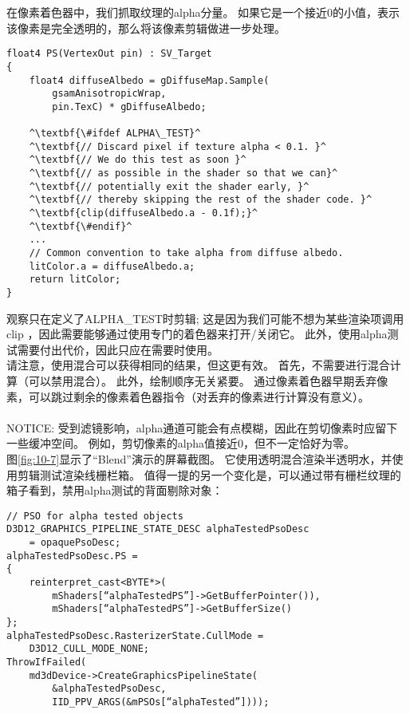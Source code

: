 \begin{flushleft}
在像素着色器中，我们抓取纹理的alpha分量。 如果它是一个接近0的小值，表示该像素是完全透明的，那么将该像素剪辑做进一步处理。
\end{flushleft}

\begin{lstlisting}[escapechar=^]
float4 PS(VertexOut pin) : SV_Target
{
    float4 diffuseAlbedo = gDiffuseMap.Sample(
        gsamAnisotropicWrap, 
        pin.TexC) * gDiffuseAlbedo;

    ^\textbf{\#ifdef ALPHA\_TEST}^
    ^\textbf{// Discard pixel if texture alpha < 0.1. }^
    ^\textbf{// We do this test as soon }^
    ^\textbf{// as possible in the shader so that we can}^
    ^\textbf{// potentially exit the shader early, }^
    ^\textbf{// thereby skipping the rest of the shader code. }^
    ^\textbf{clip(diffuseAlbedo.a - 0.1f);}^
    ^\textbf{\#endif}^
    ...
    // Common convention to take alpha from diffuse albedo.
    litColor.a = diffuseAlbedo.a;
    return litColor;
}
\end{lstlisting}

\begin{flushleft}
观察只在定义了ALPHA\_TEST时剪辑; 这是因为我们可能不想为某些渲染项调用 clip ，因此需要能够通过使用专门的着色器来打开/关闭它。 此外，使用alpha测试需要付出代价，因此只应在需要时使用。\\

请注意，使用混合可以获得相同的结果，但这更有效。 首先，不需要进行混合计算（可以禁用混合）。 此外，绘制顺序无关紧要。 通过像素着色器早期丢弃像素，可以跳过剩余的像素着色器指令（对丢弃的像素进行计算没有意义）。\\
~\\
NOTICE: 受到滤镜影响，alpha通道可能会有点模糊，因此在剪切像素时应留下一些缓冲空间。 例如，剪切像素的alpha值接近0，但不一定恰好为零。
~\\

图\ref{fig:10-7}显示了“Blend”演示的屏幕截图。 它使用透明混合渲染半透明水，并使用剪辑测试渲染线栅栏箱。 值得一提的另一个变化是，可以通过带有栅栏纹理的箱子看到，禁用alpha测试的背面剔除对象：\\
\end{flushleft}

\begin{lstlisting}
// PSO for alpha tested objects
D3D12_GRAPHICS_PIPELINE_STATE_DESC alphaTestedPsoDesc
    = opaquePsoDesc;
alphaTestedPsoDesc.PS =
{
    reinterpret_cast<BYTE*>(
        mShaders[“alphaTestedPS”]->GetBufferPointer()),
        mShaders[“alphaTestedPS”]->GetBufferSize()
};
alphaTestedPsoDesc.RasterizerState.CullMode =
    D3D12_CULL_MODE_NONE;
ThrowIfFailed(
    md3dDevice->CreateGraphicsPipelineState(
        &alphaTestedPsoDesc,
        IID_PPV_ARGS(&mPSOs[“alphaTested”])));
\end{lstlisting}

